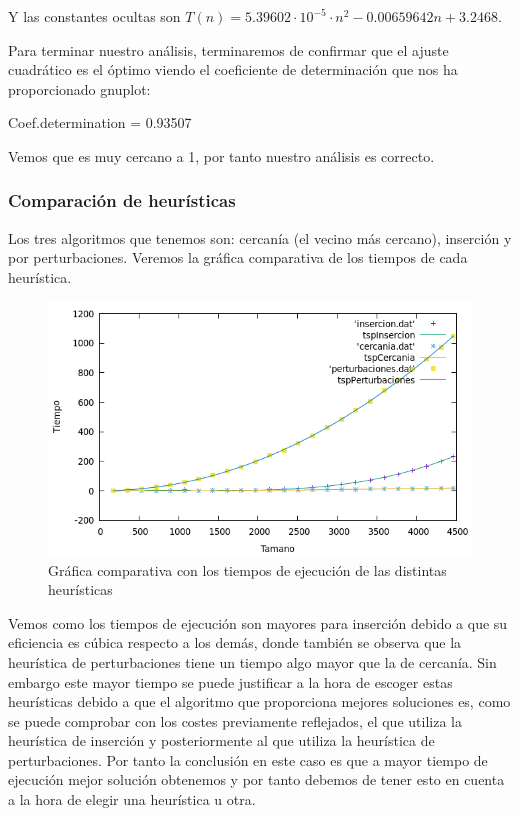 \documentclass[10pt,a4paper]{article}
\begin{document}
 \newpage
 
 Y las constantes ocultas son \(T(n) = 5.39602 \cdot 10^{-5} \cdot n^2 - 0.00659642 n + 3.2468\).
 
 Para terminar nuestro análisis, terminaremos de confirmar que el ajuste cuadrático es el óptimo viendo el coeficiente de determinación que nos ha proporcionado gnuplot:
 
 Coef.determination = 0.93507
 
 Vemos que es muy cercano a 1, por tanto nuestro análisis es correcto.

\subsubsection{Comparación de heurísticas}

Los tres algoritmos que tenemos son: cercanía (el vecino más cercano), inserción y por perturbaciones. Veremos la gráfica comparativa de los tiempos de cada heurística.

\begin{figure}[h!]
 	\centering
 	\includegraphics[scale=0.55]{./Images/comparativa_tiempos.png}
 	\caption{Gráfica comparativa con los tiempos de ejecución de las distintas heurísticas}
 \end{figure}
 
 Vemos como los tiempos de ejecución son mayores para inserción debido a que su eficiencia es cúbica respecto a los demás, donde también se observa que la heurística de perturbaciones tiene un tiempo algo mayor que la de cercanía. Sin embargo este mayor tiempo se puede justificar a la hora de escoger estas heurísticas debido a que el algoritmo que proporciona mejores soluciones es, como se puede comprobar con los costes previamente reflejados, el que utiliza la heurística de inserción y posteriormente al que utiliza la heurística de perturbaciones. Por tanto la conclusión en este caso es que a mayor tiempo de ejecución mejor solución obtenemos y por tanto debemos de tener esto en cuenta a la hora de elegir una heurística u otra.
\end{document}
